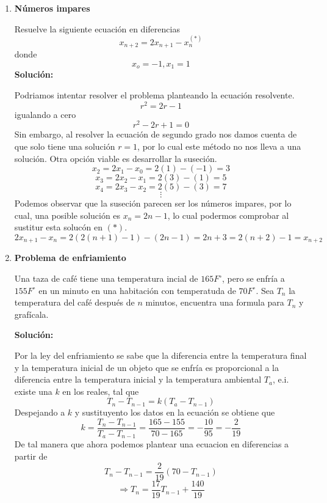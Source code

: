 \documentclass{article}
\begin{document}
\begin{enumerate}
\item \textbf{Números impares}
  
Resuelve la siguiente ecuación en diferencias
$$x_{n+2}=2x_{n+1}-x_{n}^{(*)}$$
donde
$$x_{o}=-1,x_{1}=1$$
\textbf{Solución:}

Podriamos intentar resolver el problema planteando la ecuación resolvente.
$$r^{2}=2r-1$$
igualando a cero
$$r^{2}-2r+1=0$$
Sin embargo, al resolver la ecuación de segundo grado nos damos cuenta de que solo tiene una solución $r=1$, por lo cual este método no nos lleva a una solución. Otra opción viable es desarrollar la suseción.
$$x_{2}=2x_{1}-x_{0}=2(1)-(-1)=3$$
$$x_{3}=2x_{2}-x_{1}=2(3)-(1)=5$$
$$x_{4}=2x_{3}-x_{2}=2(5)-(3)=7$$
$$\vdots$$
Podemos observar que la suseción parecen ser los números impares, por lo cual, una posible solución es $x_{n}=2n-1$, lo cual podermos comprobar al sustitur esta  solucón en $(*)$.
$$2x_{n+1}-x_{n}=2(2(n+1)-1)-(2n-1)=2n+3=2(n+2)-1=x_{n+2}$$

\item \textbf{Problema de enfriamiento}

Una taza de café tiene una temperatura incial de $165F^{\circ}$, pero se enfría a $155F^{\circ}$ en un minuto en una habitación con temperatuda de $70F^{\circ}$. Sea $T_{n}$ la temperatura del café después de $n$ minutos, encuentra una formula para $T_{n}$ y grafícala.

\textbf{Solución:}

Por la ley del enfriamiento se sabe que la diferencia entre la temperatura final y la temperatura inicial de un objeto que se enfría es proporcional a la diferencia entre la temperatura inicial y la temperatura ambiental $T_{a}$, e.i. existe una $k$ en los reales, tal que
$$T_{n}-T_{n-1}=k
\left(
  T_{a}-T_{n-1}
\right)$$
Despejando a $k$ y sustituyento los datos en la ecuación se obtiene que
$$k=\frac{T_{n}-T_{n-1}}{ T_{a}-T_{n-1}}=\frac{165-155}{70-165}=-\frac{10}{95}=-\frac{2}{19}$$
De tal manera que ahora podemos plantear una ecuacion en diferencias a partir de
$$T_{n}-T_{n-1}=\frac{2}{19}
\left(
  70-T_{n-1}
\right)$$
$$\Rightarrow T_{n}=\frac{17}{19} T_{n-1}+\frac{140}{19}$$
\end{enumerate}
\end{document}
